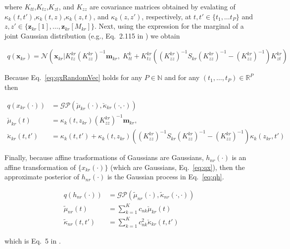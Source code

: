\documentclass[12pt]{article}
\begin{document}
\noindent where $K_{tt}$,$K_{tz}$,$K_{zt}$, and $K_{zz}$ are covariance matrices obtained by evalating of $\kappa_k(t,t')$,$\kappa_k(t,z)$,$\kappa_k(z,t)$, and $\kappa_k(z,z')$, respectively, at $t,t'\in \{t_1,\ldots t_P\}$ and $z,z'\in \{\mathbf{z}_{kr}[1],\ldots,\mathbf{z}_{kr}[M_{kr}]\}$. Next, using the expression for the marginal of a joint Gaussian distribution (e.g., Eq.~2.115 in \cite{bishop06}) we obtain

\begin{align}
    q(\mathbf{x}_{kr})=\mathcal{N}\left(\mathbf{x}_{kr}|K_{tz}^{kr}(K_{zz}^{kr})^{-1}\mathbf{m}_{kr},\;K_{tt}^k+K_{tz}^{kr}\left((K_{zz}^{kr})^{-1}S_{kr}(K_{zz}^{kr})^{-1}-(K_{zz}^{kr})^{-1  }\right)K_{zt}^{kr}\right)
    \label{eq:qxRandomVec}
\end{align}

Because Eq.~\ref{eq:qxRandomVec} holds for any $P\in\mathbb{N}$ and for any $(t_1,\ldots,t_P)\in\mathbb{R}^P$ then

\begin{equation}
    \begin{aligned}
        q(x_{kr}(\cdot))&=\mathcal{GP}\left(\breve\mu_{kr}(\cdot),\breve\kappa_{kr}(\cdot,\cdot)\right)\\
        \breve\mu_{kr}(t)&=\kappa_k(t,z_{kr})(K_{zz}^{kr})^{-1}\mathbf{m}_{kr},\\
        \breve\kappa_{kr}(t,t')&=\kappa_k(t,t')+\kappa_k(t,z_{kr})\left((K_{zz}^{kr})^{-1}S_{kr}(K_{zz}^{kr})^{-1}-(K_{zz}^{kr})^{-1}\right)\kappa_k(z_{kr},t')
    \end{aligned}
    \label{eq:qx}
\end{equation}

Finally, because affine trasformations of Gaussians are Gaussians,
$h_{nr}(\cdot)$ is an affine transformation of $\{x_{kr}(\cdot)\}$ (which are
Gaussians, Eq.~\ref{eq:qx}), then the approximate posterior of $h_{nr}(\cdot)$
is the Gaussian process in Eq.~\ref{eq:qh}.

\begin{equation}
    \begin{aligned}
        q(h_{nr}(\cdot))&=\mathcal{GP}\left(\tilde\mu_{nr}(\cdot),\tilde\kappa_{nr}(\cdot,\cdot)\right)\\
        \tilde\mu_{nr}(t)&=\sum_{k=1}^Kc_{nk}\breve\mu_{kr}(t)\\
        \tilde\kappa_{nr}(t,t')&=\sum_{k=1}^Kc_{nk}^2\breve\kappa_{kr}(t,t')
    \end{aligned}
    \label{eq:qh}
\end{equation}

\noindent which is Eq.~5 in \cite{dunckerAndSahani18}.



\end{document}
